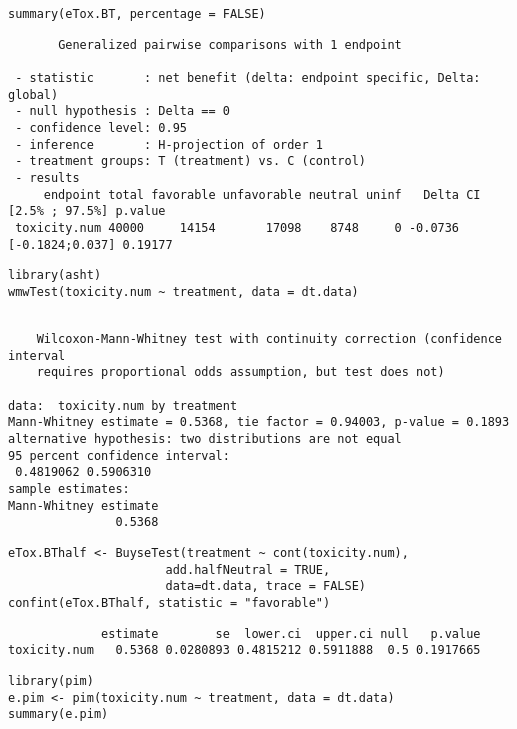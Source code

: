 \documentclass[12pt]{article}
\begin{document}
\lstset{language=r,label= ,caption= ,captionpos=b,numbers=none}
\begin{lstlisting}
summary(eTox.BT, percentage = FALSE)
\end{lstlisting}

\begin{verbatim}
       Generalized pairwise comparisons with 1 endpoint

 - statistic       : net benefit (delta: endpoint specific, Delta: global) 
 - null hypothesis : Delta == 0 
 - confidence level: 0.95 
 - inference       : H-projection of order 1
 - treatment groups: T (treatment) vs. C (control) 
 - results
     endpoint total favorable unfavorable neutral uninf   Delta CI [2.5% ; 97.5%] p.value
 toxicity.num 40000     14154       17098    8748     0 -0.0736   [-0.1824;0.037] 0.19177
\end{verbatim}

\lstset{language=r,label= ,caption= ,captionpos=b,numbers=none}
\begin{lstlisting}
library(asht)
wmwTest(toxicity.num ~ treatment, data = dt.data)
\end{lstlisting}

\begin{verbatim}

	Wilcoxon-Mann-Whitney test with continuity correction (confidence interval
	requires proportional odds assumption, but test does not)

data:  toxicity.num by treatment
Mann-Whitney estimate = 0.5368, tie factor = 0.94003, p-value = 0.1893
alternative hypothesis: two distributions are not equal
95 percent confidence interval:
 0.4819062 0.5906310
sample estimates:
Mann-Whitney estimate 
               0.5368
\end{verbatim}

\lstset{language=r,label= ,caption= ,captionpos=b,numbers=none}
\begin{lstlisting}
eTox.BThalf <- BuyseTest(treatment ~ cont(toxicity.num),
                      add.halfNeutral = TRUE,
                      data=dt.data, trace = FALSE)
confint(eTox.BThalf, statistic = "favorable")
\end{lstlisting}

\begin{verbatim}
             estimate        se  lower.ci  upper.ci null   p.value
toxicity.num   0.5368 0.0280893 0.4815212 0.5911888  0.5 0.1917665
\end{verbatim}


\lstset{language=r,label= ,caption= ,captionpos=b,numbers=none}
\begin{lstlisting}
library(pim)
e.pim <- pim(toxicity.num ~ treatment, data = dt.data)
summary(e.pim)
\end{lstlisting}
\end{document}
